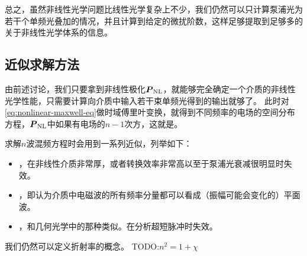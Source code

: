 总之，虽然非线性光学问题比线性光学复杂上不少，我们仍然可以只计算泵浦光为若干个单频光叠加的情况，并且计算到给定的微扰阶数，这样足够提取到足够多的关于非线性光学体系的信息。

\subsection{近似求解方法}

由前述讨论，我们只要拿到非线性极化$\vb*{P}_\text{NL}$，就能够完全确定一个介质的非线性光学性能，只需要计算向介质中输入若干束单频光得到的输出就够了。
此时对\eqref{eq:nonlinear-maxwell-eq}做时域傅里叶变换，就得到不同频率的电场的空间分布方程，$\vb*{P}_\text{NL}$中如果有电场的$n-1$次方，这就是。

求解$n$波混频方程时会用到一系列近似，列举如下：
\begin{itemize}
    \item {}，在非线性介质非常厚，或者转换效率非常高以至于泵浦光衰减很明显时失效。
    \item {}，即认为介质中电磁波的所有频率分量都可以看成（振幅可能会变化的）平面波。
    \item {}，和几何光学中的那种类似。在分析超短脉冲时失效。
\end{itemize}

我们仍然可以定义折射率的概念。
TODO:$n^2 = 1 + \chi$